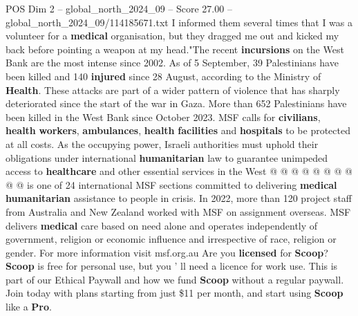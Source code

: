 \begin{textsample}{POS Dim 2 – global\_north\_2024\_09 – Score 27.00 – global\_north\_2024\_09/114185671.txt}
I informed them several times that I was a volunteer for a \textbf{medical} organisation, but they dragged me out and kicked my back before pointing a weapon at my head."The recent \textbf{incursions} on the West Bank are the most intense since 2002.
As of 5 September, 39 Palestinians have been killed and 140 \textbf{injured} since 28 August, according to the Ministry of \textbf{Health}.
These attacks are part of a wider pattern of violence that has sharply deteriorated since the start of the war in Gaza.
More than 652 Palestinians have been killed in the West Bank since October 2023.
MSF calls for \textbf{civilians}, \textbf{health} \textbf{workers}, \textbf{ambulances}, \textbf{health} \textbf{facilities} and \textbf{hospitals} to be protected at all costs.
As the occupying power, Israeli authorities must uphold their obligations under international \textbf{humanitarian} law to guarantee unimpeded access to \textbf{healthcare} and other essential services in the West @ @ @ @ @ @ @ @ @ @ is one of 24 international MSF sections committed to delivering \textbf{medical} \textbf{humanitarian} assistance to people in crisis.
In 2022, more than 120 project staff from Australia and New Zealand worked with MSF on assignment overseas.
MSF delivers \textbf{medical} care based on need alone and operates independently of government, religion or economic influence and irrespective of race, religion or gender.
For more information visit msf.org.au Are you \textbf{licensed} for \textbf{Scoop}? \textbf{Scoop} is free for personal use, but you ' ll need a licence for work use.
This is part of our Ethical Paywall and how we fund \textbf{Scoop} without a regular paywall.
Join today with plans starting from just \$11 per month, and start using \textbf{Scoop} like a \textbf{Pro}.

\end{textsample}

